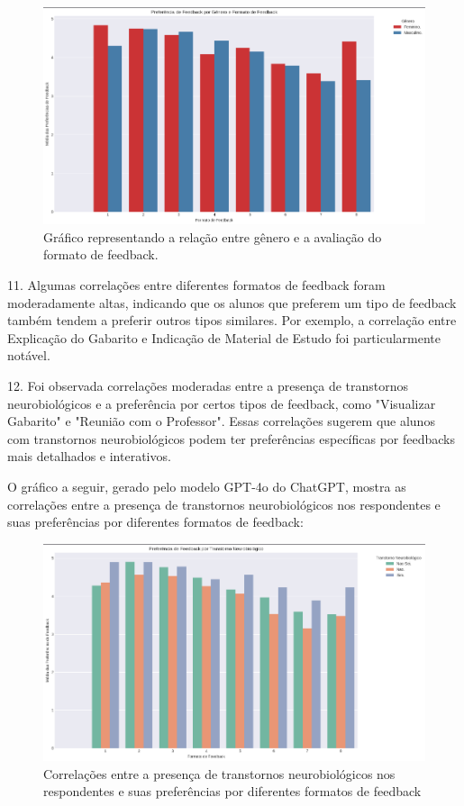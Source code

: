 \begin{figure}[H]
\centering
\includegraphics[scale=0.5]{figuras/gender.png}
\caption{Gráfico representando a relação entre gênero e a avaliação do formato de feedback.}
\end{figure}

11. Algumas correlações entre diferentes formatos de feedback foram moderadamente altas, indicando que os alunos que preferem um tipo de feedback também tendem a preferir outros tipos similares. Por exemplo, a correlação entre Explicação do Gabarito e Indicação de Material de Estudo foi particularmente notável.

12. Foi observada correlações moderadas entre a presença de transtornos neurobiológicos e a preferência por certos tipos de feedback, como "Visualizar Gabarito" e "Reunião com o Professor". Essas correlações sugerem que alunos com transtornos neurobiológicos podem ter preferências específicas por feedbacks mais detalhados e interativos.

O gráfico a seguir, gerado pelo modelo GPT-4o do ChatGPT, mostra as correlações entre a presença de transtornos neurobiológicos nos respondentes e suas preferências por diferentes formatos de feedback:

\begin{figure}[!h]
\centering
\includegraphics[scale=0.5]{figuras/neurological.png}
\caption{Correlações entre a presença de transtornos neurobiológicos nos respondentes e suas preferências por diferentes formatos de feedback}
\end{figure}

